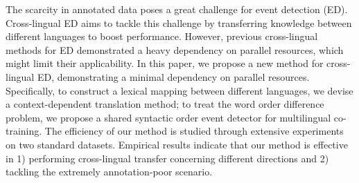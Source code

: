 The scarcity in annotated data poses a great challenge for event detection (ED). 
Cross-lingual ED aims to tackle this challenge by transferring knowledge between different languages to boost performance. 
However, previous cross-lingual methods for ED demonstrated a heavy dependency on parallel resources, which might limit their applicability.
In this paper, we propose a new method for cross-lingual ED, demonstrating a minimal dependency on parallel resources. 
Specifically, to construct a lexical mapping between different languages, we devise a context-dependent translation method; 
to treat the word order difference problem, we propose a shared syntactic order event detector for multilingual co-training.
The efficiency of our method is studied through extensive experiments on two standard datasets.
Empirical results indicate that our method is effective in 1) performing cross-lingual transfer concerning different directions and 2) tackling the extremely annotation-poor scenario.